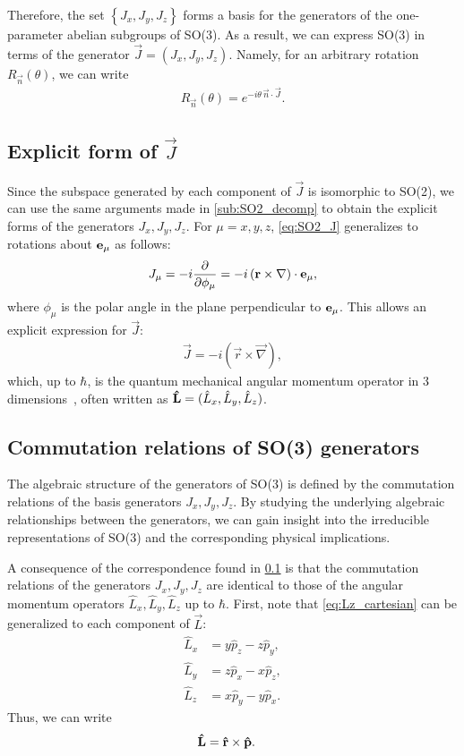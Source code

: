 Therefore, the set $\left\{ J_x,J_y,J_z \right\}$ forms a basis for the generators of the one-parameter abelian subgroups of SO(3). As a result, we can express SO(3) in terms of the generator $\vec{J} = (J_x,J_y,J_z)$. Namely, for an arbitrary rotation $R_{\vec{n}}(\theta)$, we can write
\begin{align*}
    R_{\vec{n}}(\theta) = e^{-i\theta\,\vec{n}\cdot\vec{J}}.
\end{align*}

\subsection{Explicit form of $\vec{J}$}\label{sec:SO3_J}
Since the subspace generated by each component of $\vec{J}$ is isomorphic to SO(2), we can use the same arguments made in \cref{sub:SO2_decomp} to obtain the explicit forms of the generators $J_x,J_y,J_z$. For $\mu=x,y,z$, \cref{eq:SO2_J} generalizes to rotations about $\mathbf{e}_\mu$ as follows:
\begin{align*}
    J_\mu = -i \frac{\partial}{\partial\phi_\mu} = -i \left( \mathbf{r}\times\mathbf{\nabla} \right)\cdot\mathbf{e}_\mu,
\end{align*}
where $\phi_\mu$ is the polar angle in the plane perpendicular to $\mathbf{e}_\mu$. This allows an explicit expression for $\vec{J}$:
\begin{align}
    \vec{J} = -i \left( \vec{r}\times\vec{\nabla} \right),
\end{align}
which, up to $\hbar$, is the quantum mechanical angular momentum operator in 3 dimensions~\cite{Hall2013}, often written as $\mathbf{\hat{L}}=(\hat{L}_x,\hat{L}_y,\hat{L}_z)$.

\subsection{Commutation relations of SO(3) generators}\label{sub:SO3_comms}
The algebraic structure of the generators of SO(3) is defined by the commutation relations of the basis generators $J_x,J_y,J_z$. By studying the underlying algebraic relationships between the generators, we can gain insight into the irreducible representations of SO(3) and the corresponding physical implications.

A consequence of the correspondence found in \cref{sec:SO3_J} is that the commutation relations of the generators $J_x,J_y,J_z$ are identical to those of the angular momentum operators $\hat{L}_x,\hat{L}_y,\hat{L}_z$ up to $\hbar$. First, note that \cref{eq:Lz_cartesian} can be generalized to each component of $\vec{L}$:
\begin{align}
    \hat{L}_x &= y \hat{p}_z - z \hat{p}_y, \\
    \hat{L}_y &= z \hat{p}_x - x \hat{p}_z, \\
    \hat{L}_z &= x \hat{p}_y - y \hat{p}_x.
\end{align}
Thus, we can write
\begin{align}
    \mathbf{\hat{L}} &= \mathbf{\hat{r}}\times\mathbf{\hat{p}}.
\end{align}

